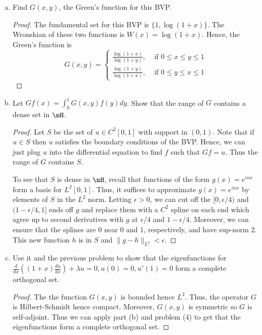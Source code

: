 \documentclass{article}
\begin{document}
\begin{enumerate}[(a)]
\item Find $G(x,y)$, the Green's function for this BVP.

\begin{proof}
The fundamental set for this BVP is $\{1, \log(1 + x)\}$.
The Wronskian of these two functions is $W(x) = \log(1+x)$. 
Hence, the Green's function is
$$G(x,y) = \left\{ \begin{array}{ll}
\frac {\log(1+x)}{\log(1 + y)}, & \text{ if } 0 \le x \le y \le 1
\\\frac {\log(1+y)}{\log(1 + x)}, & \text{ if } 0 \le y \le x \le 1
\end{array}
\right.
$$
\end{proof}
\item Let $Gf(x) = \int_0^1 G(x,y) f(y) dy$. Show that the range of $G$ contains a dense set in $\mH$. 
\begin{proof}
Let $S$ be the set of $u \in C^2[0,1]$ with support in $(0,1)$.  Note that if $u \in S$ then $u$ satisfies the boundary conditions of the BVP.  Hence, we can just plug $u$ into the differential equation to find $f$ such that $Gf = u$.  Thus the range of $G$ contains $S$.

To see that $S$ is dense in $\mH$, recall that functions of the form $g(x) = e^{inx}$ form a basis for $L^2[0,1]$.  Thus, it suffices to approximate $g(x) = e^{inx}$ by elements of $S$ in the $L^2$ norm. Letting $\epsilon > 0$, we can cut off the $[0, \epsilon/4)$ and $(1- \epsilon/4, 1]$ ends off $g$ and replace them with a $C^2$ spline on each end which agree up to second derivatives with $g$ at $\epsilon/4$ and $1 - \epsilon/4$.  Moreover, we can ensure that the splines are $0$ near $0$ and $1$, respectively, and have sup-norm $2$. This new function $h$ is in $S$ and $\|g - h\|_{L^2} < \epsilon$.
\end{proof}

\item Use it and the previous problem to show that the eigenfunctions for $\frac d {dx} \left((1+x) \frac{du}{dx}\right) + \lambda u = 0, u(0) = 0, u'(1) = 0$ form a complete orthogonal set.
\begin{proof}
The the function $G(x,y)$ is bounded hence $L^2$. Thus, the operator $G$ is Hilbert-Schmidt hence compact.  Moreover, $G(x,y)$ is symmetric so $G$ is self-adjoint.  Thus we can apply part (b) and problem (4) to get that the eigenfunctions form a complete orthogonal set.
\end{proof}
\end{enumerate}
\end{document}
